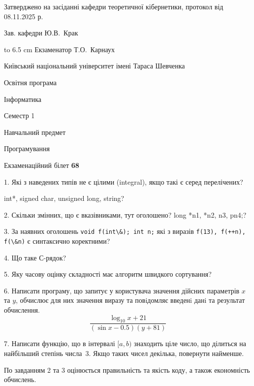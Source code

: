 \documentclass[12pt, ukrainian]{article}
\def\code#1{\Verb!#1!}
\begin{document}
{\smallskip\smallskip \begin {scriptsize} Затверджено на засіданні кафедри теоретичної кібернетики, протокол   від   08.11.2025 р.\par\smallskip\smallskip\smallskip\smallskip
{\parbox {6.5 cm} {Зав. кафедри \dotfill Ю.В.~Крак}}\hspace {0.7cm} {\hbox to 6.5 cm { Екзаменатор \dotfill Т.О.~Карнаух}} \end{scriptsize}}
\vspace{0.9cm}
{{\begin {scriptsize}\par
{ \center  Київський національний університет імені Тараса Шевченка \par}
{\parbox {5 cm}{Освітня програма \hfill}{\parbox {7 cm}{Інформатика\hfill}}\parbox {6 cm}{\hfill Семестр 1}}\par
{\parbox {5 cm} {Навчальний предмет \hfill}\parbox {7 cm}{Програмування \hfill}\parbox {6cm}{\hfill}\par}\vspace{-15pt} \end{scriptsize}}{\center Екзаменаційний білет \No \textbf { 68 }\par}}
{%
1. Які з наведених типів не є цілими (integral), якщо такі є серед перелічених?

int*, signed char, unsigned long, string?
\par
\vspace{2mm}
2. Скільки змінних, що є вказівниками, тут оголошено?
long *n1, *n2, n3, pn4;?
\par
\vspace{2mm}
3. За наявних оголошень \code{void f(int\&); int n;} які з виразів \code{f(13), f(++n), f(\&n)} є синтаксично коректними?
\par
\vspace{2mm}
4. Що таке С-рядок?
\par
\vspace{2mm}
5. Яку часову оцінку складності має алгоритм швидкого сортування?
\par
\vspace{2mm}
6. Написати програму, що запитує у користувача значення дійсних параметрів $x$ та $y$, обчислює для них значення виразу та повiдомляє введенi данi та результат обчислення.
$$\frac{\log_{10} x + 21}{(\sin x - 0.5) (y + 81)}$$ 

\par
7. Написати функцію, що в інтервалі $[a, b)$ знаходить ціле число, що ділиться на найбільший степінь числа 3. Якщо таких чисел декілька, повернути найменше.

По завданням 2 та 3 оцінюється правильність та якість коду, а також економність обчислень.

}
\end{document}

